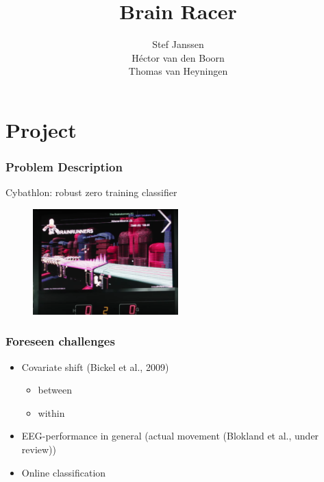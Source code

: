 \documentclass{beamer}
\title[Brain Racer]{
  Brain Racer}
\author[Stef, H\'ector, Thomas]{Stef Janssen\\H\'ector van den Boorn\\Thomas van Heyningen }
\begin{document}
\begin{frame}
  \titlepage
\end{frame}




\section{Project}
\begin{frame}
  \frametitle{Problem Description}

  Cybathlon: robust zero training classifier

  \begin{figure}
   
    \includegraphics[width=0.5\textwidth]{cybathlon_challenge.png}
  \end{figure}
  
\end{frame}

\begin{frame}
  \frametitle{Foreseen challenges}

  \begin{itemize}
    \item Covariate shift (Bickel et al., 2009)
\begin{itemize}
 \item between
 \item within
\end{itemize}
    \item EEG-performance in general (actual movement (Blokland et al., under review))
    \item Online classification
  \end{itemize}
\end{frame}
\end{document}

